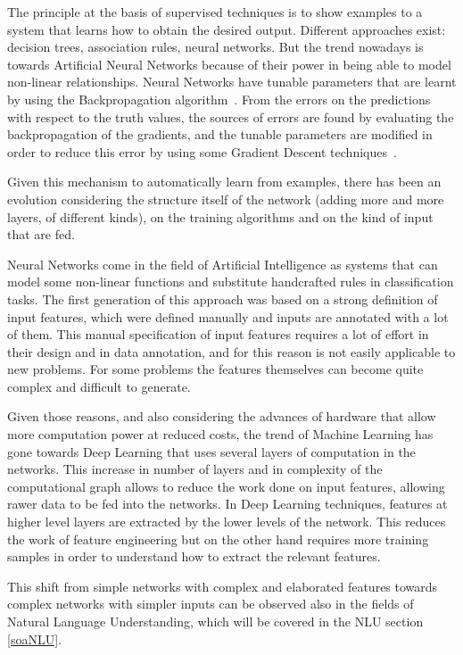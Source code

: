 The principle at the basis of supervised techniques is to show examples to a system that learns how to obtain the desired output. Different approaches exist: decision trees, association rules, neural networks. But the trend nowadays is towards Artificial Neural Networks because of their power in being able to model non-linear relationships. Neural Networks have tunable parameters that are learnt by using the Backpropagation algorithm~\cite{rumelhart1986learning}. From the errors on the predictions with respect to the truth values, the sources of errors are found by evaluating the backpropagation of the gradients, and the tunable parameters are modified in order to reduce this error by using some Gradient Descent techniques~\cite{bottou2010large}.

Given this mechanism to automatically learn from examples, there has been an evolution considering the structure itself of the network (adding more and more layers, of different kinds), on the training algorithms and on the kind of input that are fed.

Neural Networks come in the field of Artificial Intelligence as systems that can model some non-linear functions and substitute handcrafted rules in classification tasks. The first generation of this approach was based on a strong definition of input features, which were defined manually and inputs are annotated with a lot of them. This manual specification of input features requires a lot of effort in their design and in data annotation, and for this reason is not easily applicable to new problems. For some problems the features themselves can become quite complex and difficult to generate.

Given those reasons, and also considering the advances of hardware that allow more computation power at reduced costs, the trend of Machine Learning has gone towards Deep Learning that uses several layers of computation in the networks. This increase in number of layers and in complexity of the computational graph allows to reduce the work done on input features, allowing rawer data to be fed into the networks. In Deep Learning techniques, features at higher level layers are extracted by the lower levels of the network. This reduces the work of feature engineering but on the other hand requires more training samples in order to understand how to extract the relevant features.

This shift from simple networks with complex and elaborated features towards complex networks with simpler inputs can be observed also in the fields of Natural Language Understanding, which will be covered in the NLU section \ref{soaNLU}.

